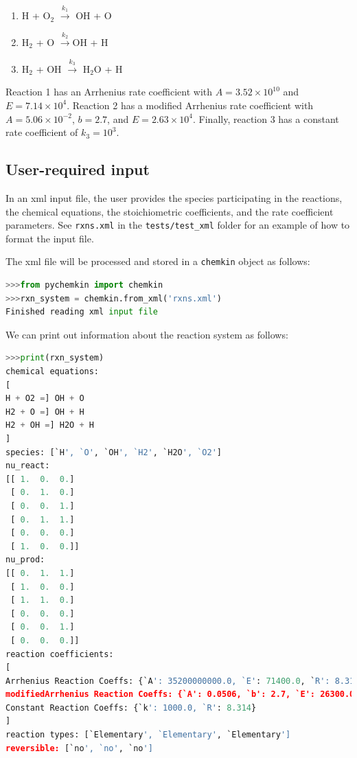 \documentclass[12pt]{article}
\begin{document}
\begin{enumerate}
\item H + O$_2$ $\overset{k_1}{\rightarrow}$ OH + O
\item H$_2$ + O $\overset{k_2}{\rightarrow}$OH + H
\item H$_2$ + OH $\overset{k_3}{\rightarrow}$ H$_2$O + H
\end{enumerate}

Reaction 1 has an Arrhenius rate coefficient with $A = 3.52\times 10^{10}$ and $E = 7.14\times 10^4$. Reaction 2 has a modified Arrhenius rate coefficient with $A = 5.06\times 10^{-2}$, $b = 2.7$, and $E = 2.63\times10^4$. Finally, reaction 3 has a constant rate coefficient of $k_3 = 10^3$.



\subsection{User-required input}
In an xml input file, the user provides the species participating in the reactions, the chemical equations, the stoichiometric coefficients, and the rate coefficient parameters. See {\tt rxns.xml} in the {\tt tests/test\_xml} folder for an example of how to format the input file. 

The xml file will be processed and stored in a {\tt chemkin} object as follows:
\begin{lstlisting}[language = Python, basicstyle = \ttfamily, breaklines = True, columns = fullflexible]
>>>from pychemkin import chemkin
>>>rxn_system = chemkin.from_xml('rxns.xml')
Finished reading xml input file
\end{lstlisting}

We can print out information about the reaction system as follows:
\begin{lstlisting}[language = Python, basicstyle = \ttfamily,columns = fullflexible, showstringspaces = False]
>>>print(rxn_system)
chemical equations:
[
H + O2 =] OH + O
H2 + O =] OH + H
H2 + OH =] H2O + H
]
species: [`H', `O', `OH', `H2', `H2O', `O2']
nu_react:
[[ 1.  0.  0.]
 [ 0.  1.  0.]
 [ 0.  0.  1.]
 [ 0.  1.  1.]
 [ 0.  0.  0.]
 [ 1.  0.  0.]]
nu_prod:
[[ 0.  1.  1.]
 [ 1.  0.  0.]
 [ 1.  1.  0.]
 [ 0.  0.  0.]
 [ 0.  0.  1.]
 [ 0.  0.  0.]]
reaction coefficients:
[
Arrhenius Reaction Coeffs: {`A': 35200000000.0, `E': 71400.0, `R': 8.314}
modifiedArrhenius Reaction Coeffs: {`A': 0.0506, `b': 2.7, `E': 26300.0, `R': 8.314}
Constant Reaction Coeffs: {`k': 1000.0, `R': 8.314}
]
reaction types: [`Elementary', `Elementary', `Elementary']
reversible: [`no', `no', `no']
\end{lstlisting}
\end{document}

